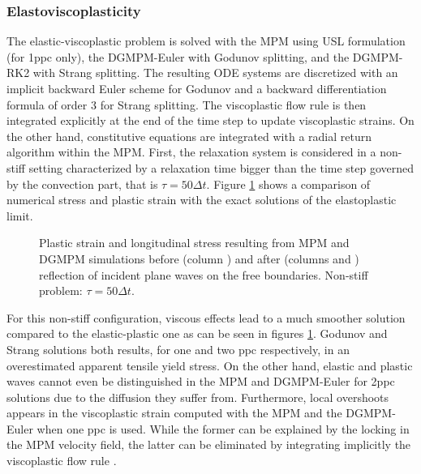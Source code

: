 \subsubsection{Elastoviscoplasticity}
The elastic-viscoplastic problem is solved with the MPM using USL formulation (for 1ppc only), the DGMPM-Euler with Godunov splitting, and the DGMPM-RK2 with Strang splitting. The resulting ODE systems are discretized with an implicit backward Euler scheme for Godunov and a backward differentiation formula of order 3 for Strang splitting. The viscoplastic flow rule is then integrated explicitly at the end of the time step to update viscoplastic strains. On the other hand, constitutive equations are integrated with a radial return algorithm \cite{Simo} within the MPM. First, the relaxation system is considered in a non-stiff setting characterized by a relaxation time bigger than the time step governed by the convection part, that is $\tau=50\Delta t$. Figure \ref{fig:nonstiff_elastoviscoplastic_RP} shows a comparison of numerical stress and plastic strain with the exact solutions of the elastoplastic limit.
\begin{figure}[h!]
  \centering
  { \label{subfig:evp_nonstiff1}}
  { \label{subfig:evp_nonstiff2}}
  { \label{subfig:evp_nonstiff3}}
  {}
  \caption{Plastic strain and longitudinal stress resulting from MPM and DGMPM simulations before (column ) and after (columns  and ) reflection of incident plane waves on the free boundaries. Non-stiff problem: $\tau=50\Delta t$.}
  \label{fig:nonstiff_elastoviscoplastic_RP}
\end{figure}
For this non-stiff configuration, viscous effects lead to a much smoother solution compared to the elastic-plastic one as can be seen in figures \ref{fig:nonstiff_elastoviscoplastic_RP}. Godunov and Strang solutions both results, for one and two ppc respectively, in an overestimated apparent tensile yield stress. On the other hand, elastic and plastic waves cannot even be distinguished in the MPM and DGMPM-Euler for 2ppc solutions due to the diffusion they suffer from. Furthermore, local overshoots appears in the viscoplastic strain computed with the MPM and the DGMPM-Euler when one ppc is used. While the former can be explained by the locking in the MPM velocity field, the latter can be eliminated by integrating implicitly the viscoplastic flow rule \cite{Thomas_EVP}.

